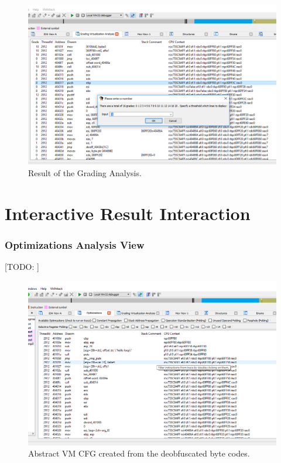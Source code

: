 \documentclass[10pt,twoside,a4paper,bibliography=totoc]{scrbook}
\newcommand{\todo}[1]{{\color{magenta} [TODO: #1]}}
\begin{document}
\begin{figure}[htp]
\centering
\includegraphics[scale=0.40]{images/ch3/grading3.png}
\caption{Result of the Grading Analysis.}
\label{result_grading}
\end{figure}


\section{Interactive Result Interaction}
\label{sec3:UI}
\subsubsection{Optimizations Analysis View}
\todo{}
\begin{figure}[H]
\centering
\includegraphics[scale=0.40]{images/ch3/optimizations1.png}
\caption{Abstract VM CFG created from the deobfuscated byte codes.}
\label{}
\end{figure}
\end{document}
